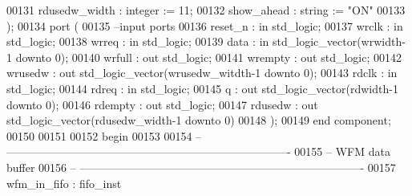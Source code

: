 \begin{DoxyCode}
00131         rdusedw_width       : \textcolor{comment}{integer} := \textcolor{vhdllogic}{}\textcolor{vhdllogic}{11};
00132         show_ahead          : \textcolor{comment}{string}  := \textcolor{keyword}{"ON"}
00133   );  
00134   \textcolor{keywordflow}{port} (
00135 \textcolor{keyword}{      --input ports }
00136       reset_n               : \textcolor{keywordflow}{in} \textcolor{comment}{std\_logic};
00137       wrclk                 : \textcolor{keywordflow}{in} \textcolor{comment}{std\_logic};
00138       wrreq                 : \textcolor{keywordflow}{in} \textcolor{comment}{std\_logic};
00139       data                  : \textcolor{keywordflow}{in} \textcolor{comment}{std\_logic\_vector}(wrwidth\textcolor{vhdlchar}{-}\textcolor{vhdllogic}{}\textcolor{vhdllogic}{1} \textcolor{keywordflow}{downto} \textcolor{vhdllogic}{}\textcolor{vhdllogic}{0});
00140       wrfull                : \textcolor{keywordflow}{out} \textcolor{comment}{std\_logic};
00141         wrempty             : \textcolor{keywordflow}{out} \textcolor{comment}{std\_logic};
00142       wrusedw               : \textcolor{keywordflow}{out} \textcolor{comment}{std\_logic\_vector}(wrusedw_witdth\textcolor{vhdlchar}{-}\textcolor{vhdllogic}{}\textcolor{vhdllogic}{1} \textcolor{keywordflow}{downto} \textcolor{vhdllogic}{}\textcolor{vhdllogic}{0});
00143       rdclk                 : \textcolor{keywordflow}{in} \textcolor{comment}{std\_logic};
00144       rdreq                 : \textcolor{keywordflow}{in} \textcolor{comment}{std\_logic};
00145       q                     : \textcolor{keywordflow}{out} \textcolor{comment}{std\_logic\_vector}(rdwidth\textcolor{vhdlchar}{-}\textcolor{vhdllogic}{}\textcolor{vhdllogic}{1} \textcolor{keywordflow}{downto} \textcolor{vhdllogic}{}\textcolor{vhdllogic}{0});
00146       rdempty               : \textcolor{keywordflow}{out} \textcolor{comment}{std\_logic};
00147       rdusedw               : \textcolor{keywordflow}{out} \textcolor{comment}{std\_logic\_vector}(rdusedw_width\textcolor{vhdlchar}{-}\textcolor{vhdllogic}{}\textcolor{vhdllogic}{1} \textcolor{keywordflow}{downto} \textcolor{vhdllogic}{}\textcolor{vhdllogic}{0})     
00148         );
00149 \textcolor{keywordflow}{end} \textcolor{keywordflow}{component};
00150 
00151   
00152 \textcolor{vhdlkeyword}{begin}
00153 
00154 \textcolor{keyword}{-- ----------------------------------------------------------------------------}
00155 \textcolor{keyword}{-- WFM data buffer}
00156 \textcolor{keyword}{-- ----------------------------------------------------------------------------}
00157 wfm_in_fifo : fifo_inst 

\end{DoxyCode}
